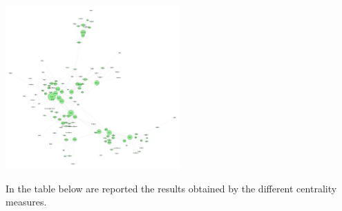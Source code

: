 \documentclass[10pt,twocolumn,letterpaper]{article}
\begin{document}
\begin{center}
    \includegraphics[width=0.5\textwidth]{img/s3/pagerank_network.jpg}
\end{center}

In the table below are reported the results obtained by the different centrality measures.
\end{document}
